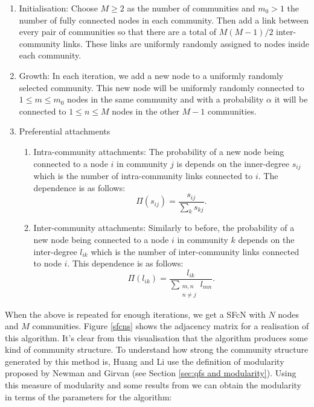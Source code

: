 \begin{enumerate}
    \item Initialisation: Choose $M \geq 2$ as the number of communities and $m_0 > 1$ the number of fully connected nodes in each community. Then add a link between every pair of communities so that there are a total of $M(M-1)/2$ inter-community links. These links are uniformly randomly assigned to nodes inside each community. \\
    \item Growth: In each iteration, we add a new node to a uniformly randomly selected community. This new node will be uniformly randomly connected to $1 \leq m \leq m_0$ nodes in the same community and with a probability $\alpha$ it will be connected to $1 \leq n \leq M$ nodes in the other $M - 1$ communities. \\
    \item Preferential attachments
    \begin{enumerate}
        \item Intra-community attachments: The probability of a new node being connected to a node $i$ in community $j$ is depends on the inner-degree $s_{ij}$ which is the number of intra-community links connected to $i$. The dependence is as follows:
            $$ \Pi(s_{ij}) = \frac{s_{ij}}{\sum_ks_{kj}}. $$
        \item Inter-community attachments: Similarly to before, the probability of a new node being connected to a node $i$ in community $k$ depends on the inter-degree $l_{ik}$ which is the number of inter-community links connected to node $i$. This dependence is as follows:
            $$ \Pi(l_{ik}) = \frac{l_{ik}}{\sum_{\substack{m, n \\ n \not = j}} l_{mn}}. $$
    \end{enumerate}
\end{enumerate}

When the above is repeated for enough iterations, we get a SFcN with $N$ nodes and $M$ communities. Figure \ref{sfcns} shows the adjacency matrix for a realisation of this algorithm. It's clear from this visualisation that the algorithm produces some kind of community structure. To understand how strong the community structure generated by this method is, Huang and Li use the definition of modularity proposed by Newman and Girvan (see Section \ref{sec:qfs and modularity}). Using this measure of modularity and some results from \cite{Li_2005} we can obtain the modularity in terms of the parameters for the algorithm:

